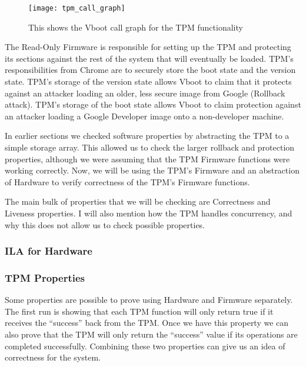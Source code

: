 \documentclass[../report.tex]{subfiles}
\begin{document}
\begin{figure}
  \centering
  \texttt{[image: tpm\_call\_graph]}
  \caption{This shows the Vboot call graph for the TPM functionality}\label{fig:tpm_call_graph}
\end{figure}

The Read-Only Firmware is responsible for setting up the TPM and protecting its
sections against the rest of the system that will eventually be loaded.
TPM's responsibilities from Chrome are to securely store the boot state and the
version state.
TPM's storage of the version state allows Vboot to claim that it protects against 
an attacker loading an older, less secure image from Google (Rollback attack).
TPM's storage of the boot state allows Vboot to claim protection against an attacker loading a Google Developer image onto a non-developer machine.

In earlier sections we checked software properties by abstracting the TPM to a simple storage array. 
This allowed us to check the larger rollback and protection properties, although we were assuming that the TPM Firmware functions were working correctly.
Now, we will be using the TPM's Firmware and an abstraction of Hardware to verify correctness of the TPM's Firmware functions.

The main bulk of properties that we will be checking are Correctness and Liveness properties. 
I will also mention how the TPM handles concurrency, and why this does not allow us to check possible properties.



\subsubsection{ILA for Hardware}   

\subsubsection{TPM Properties}   

Some properties are possible to prove using Hardware and Firmware separately.
The first run is showing that each TPM function will only return true if it receives the ``success'' back from the TPM\@.
Once we have this property we can also prove that the TPM will only return the ``success'' value if its operations are completed successfully. 
Combining these two properties can give us an idea of correctness for the system.
\end{document}
